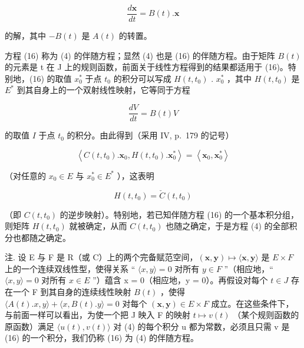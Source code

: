 \[
{\frac {d \mathbf {x}}{d t}} = B (t). \mathbf {x}\tag{16}
\]

的解，其中 \(-B(t)\) 是 \(A(t)\) 的转置。

方程 (16) 称为 (4) 的伴随方程；显然 (4) 也是 (16) 的伴随方程。由于矩阵 \(B(t)\) 的元素是 t 在 J 上的规则函数，前面关于线性方程得到的结果都适用于 (16)。特别地，(16) 的取值 \(x_{0}^{*}\) 于点 \(t_{0}\) 的积分可以写成 \(H(t, t_{0})\) . \(x_{0}^{*}\) ，其中 \(H(t, t_{0})\) 是 \(E^{*}\) 到其自身上的一个双射线性映射，它等同于方程

\[
\frac {d V}{d t} = B (t) V\tag{17}
\]

的取值 \(I\) 于点 \(t_0\) 的积分。由此得到（采用 IV, p.~179 的记号）

\[
\left\langle C (t, t _ {0}). \mathbf {x} _ {0}, H (t, t _ {0}). \mathbf {x} _ {0} ^ {*} \right\rangle = \left\langle \mathbf {x} _ {0}, \mathbf {x} _ {0} ^ {*} \right\rangle
\]

（对任意的 \(x_{0} \in E\) 与 \(x_{0}^{*} \in E^{*}\) ），这表明

\[
H (t, t _ {0}) = \check {C} (t, t _ {0})\tag{18}
\]

（即 \(C(t, t_{0})\) 的逆步映射）。特别地，若已知伴随方程 (16) 的一个基本积分组，则矩阵 \(H(t, t_{0})\) 就被确定，从而 \(C(t, t_{0})\) 也随之确定，于是方程 (4) 的全部积分也都随之确定。

注. 设 E 与 F 是 R（或 C）上的两个完备赋范空间，\((\mathbf{x}, \mathbf{y}) \mapsto \langle \mathbf{x}, \mathbf{y} \rangle\) 是 \(E \times F\) 上的一个连续双线性型，使得关系 `` \(\langle x, y \rangle = 0\) 对所有 \(y \in F\) ''（相应地，`` \(\langle x, y \rangle = 0\) 对所有 \(x \in E\) ''）蕴含 x = 0（相应地，y = 0）。再假设对每个 \(t \in J\) 存在一个 F 到其自身的连续线性映射 \(B(t)\) ，使得 \(\langle A(t).x, y \rangle + \langle x, B(t).y \rangle = 0\) 对每个 \((\mathbf{x}, \mathbf{y}) \in E \times F\) 成立。在这些条件下，与前面一样可以看出，为使一个把 J 映入 F 的映射 \(t \mapsto v(t)\) （某个规则函数的原函数）满足 \(\langle u(t), v(t) \rangle\) 对 (4) 的每个积分 u 都为常数，必须且只需 v 是 (16) 的一个积分，我们仍称 (16) 为 (4) 的伴随方程。

